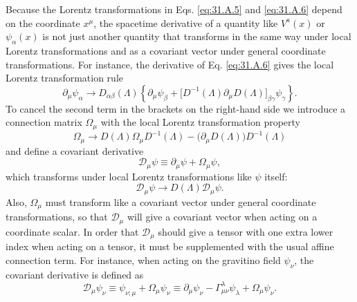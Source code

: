 Because the Lorentz transformations in Eqs. \eqref{eq:31.A.5} and
\eqref{eq:31.A.6} depend on the coordinate \(x^\mu\), the spacetime
derivative of a quantity like \(V^a(x)\) or \(\psi_\alpha(x)\) is not
just another quantity that transforms in the same way under local Lorentz
transformations and as a covariant vector under general coordinate
transformations. For instance, the derivative of Eq. \eqref{eq:31.A.6}
gives the local Lorentz transformation rule
\[
  \partial_\mu\psi_\alpha
  \longrightarrow
  D_{\alpha\beta}(\Lambda)
  \left\{
    \partial_\mu\psi_\beta
    +\bigl[D^{-1}(\Lambda)\partial_\mu D(\Lambda)\bigr]_{\beta\gamma}
      \psi_\gamma
  \right\}.
\]
To cancel the second term in the brackets on the right-hand side we
introduce a connection matrix \(\Omega_\mu\) with the local Lorentz
transformation property
\begin{equation}
  \Omega_\mu
  \longrightarrow
  D(\Lambda)\Omega_\mu D^{-1}(\Lambda)
  -\bigl(\partial_\mu D(\Lambda)\bigr)D^{-1}(\Lambda)
  \tag{31.A.7}\label{eq:31.A.7}
\end{equation}
and define a covariant derivative
\begin{equation}
  \mathscr{D}_\mu\psi
  \equiv\partial_\mu\psi+\Omega_\mu\psi,
  \tag{31.A.8}\label{eq:31.A.8}
\end{equation}
which transforms under local Lorentz transformations like \(\psi\)
itself:
\begin{equation}
  \mathscr{D}_\mu\psi
  \longrightarrow
  D(\Lambda)\mathscr{D}_\mu\psi.
  \tag{31.A.9}\label{eq:31.A.9}
\end{equation}
Also, \(\Omega_\mu\) must transform like a covariant vector under general
coordinate transformations, so that \(\mathscr{D}_\mu\) will give a
covariant vector when acting on a coordinate scalar. In order that
\(\mathscr{D}_\mu\) should give a tensor with one extra lower index when
acting on a tensor, it must be supplemented with the usual affine
connection term. For instance, when acting on the gravitino field
\(\psi_\nu\), the covariant derivative is defined as
\begin{equation}
  \mathscr{D}_\mu\psi_\nu
  \equiv\psi_{\nu;\mu}+\Omega_\mu\psi_\nu
  \equiv\partial_\mu\psi_\nu
    -\Gamma^\lambda_{\mu\nu}\psi_\lambda+\Omega_\mu\psi_\nu.
  \tag{31.A.10}\label{eq:31.A.10}
\end{equation}

